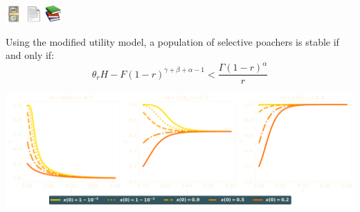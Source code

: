 \documentclass{beamer}
\begin{document}
\begin{frame}
    \centering
    \includegraphics[width=.15\textwidth]{static/1F4B5c.pdf} \hspace{1cm}
    \includegraphics[width=.15\textwidth]{static/1F4C4.pdf} \hspace{1cm}
    \includegraphics[width=.15\textwidth]{static/1F4DA.pdf}
\end{frame}

\begin{frame}
    \centering
    \footnotesize
    \begin{theorem}[Indiscriminate]
    Using the modified utility model, a population of selective poachers is stable
    if and only if:
     \[\theta_r H - F (1 − r)^{\gamma + \beta + \alpha -1} < \frac{\Gamma(1 - r)^{\alpha}}{r}\]
    \end{theorem}

    \pause
    \vspace{1cm}
    \centering
    \includegraphics[width=\textwidth]{static/numeric_two.pdf}
\end{frame}

\end{document}
